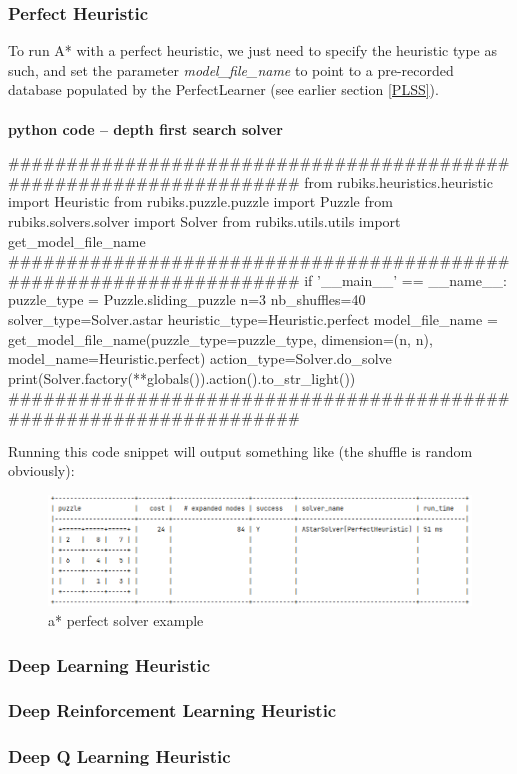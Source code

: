 \subsubsection{Perfect Heuristic}
To run A{*} with a perfect heuristic, we just need to specify the heuristic type as such, and set the parameter \textit{model\_file\_name} to point to a pre-recorded database populated by the PerfectLearner (see earlier section \ref{PLSS}).


\afblue
\paragraph{}{\textbf{python code -- depth first search solver}}
\begin{python}
####################################################################
from rubiks.heuristics.heuristic import Heuristic
from rubiks.puzzle.puzzle import Puzzle
from rubiks.solvers.solver import Solver
from rubiks.utils.utils import get_model_file_name
####################################################################
if '__main__' == __name__:
    puzzle_type = Puzzle.sliding_puzzle
    n=3
    nb_shuffles=40
    solver_type=Solver.astar
    heuristic_type=Heuristic.perfect
    model_file_name = get_model_file_name(puzzle_type=puzzle_type,
                                          dimension=(n, n),
                                          model_name=Heuristic.perfect)
    action_type=Solver.do_solve
    print(Solver.factory(**globals()).action().to_str_light())
####################################################################
\end{python}
\black
Running this code snippet will output something like (the shuffle is random obviously):


\begin{figure}[H]
\centering
\includegraphics[scale=0.5]{./Figures/exampleastarperfectsolver}
\caption[Examples]{a* perfect solver example}
\label{fig:exampleastarperfectsolver}
\end{figure}



\subsubsection{Deep Learning Heuristic}
\subsubsection{Deep Reinforcement Learning Heuristic}
\subsubsection{Deep Q Learning Heuristic}


